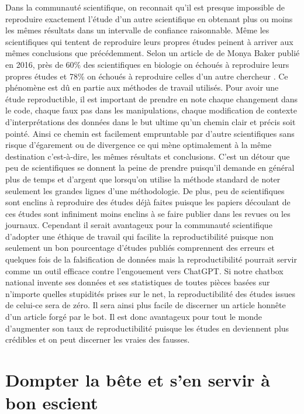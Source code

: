 \documentclass[preprint, 3p,
authoryear]{elsarticle} %
\begin{document}
Dans la communauté scientifique, on reconnait qu'il est presque
impossible de reproduire exactement l'étude d'un autre scientifique en
obtenant plus ou moins les mêmes résultats dans un intervalle de
confiance raisonnable. Même les scientifiques qui tentent de reproduire
leurs propres études peinent à arriver aux mêmes conclusions que
précédemment. Selon un article de de Monya Baker publié en 2016, près de
60\% des scientifiques en biologie on échoués à reproduire leurs propres
études et 78\% on échoués à reproduire celles d'un autre chercheur
\citep{open_science_collaboration_estimating_2015}. Ce phénomène est dû
en partie aux méthodes de travail utilisés. Pour avoir une étude
reproductible, il est important de prendre en note chaque changement
dans le code, chaque faux pas dans les manipulations, chaque
modification de contexte d'interprétations des données dans le but
ultime qu'un chemin clair et précis soit pointé. Ainsi ce chemin est
facilement empruntable par d'autre scientifiques sans risque d'égarement
ou de divergence ce qui mène optimalement à la même destination
c'est-à-dire, les mêmes résultats et conclusions. C'est un détour que
peu de scientifiques se donnent la peine de prendre puisqu'il demande en
général plus de temps et d'argent que lorsqu'on utilise la méthode
standard de noter seulement les grandes lignes d'une méthodologie. De
plus, peu de scientifiques sont enclins à reproduire des études déjà
faites puisque les papiers découlant de ces études sont infiniment moins
enclins à se faire publier dans les revues ou les journaux. Cependant il
serait avantageux pour la communauté scientifique d'adopter une éthique
de travail qui facilite la reproductibilité puisque non seulement un bon
pourcentage d'études publiés comprennent des erreurs et quelques fois de
la falsification de données mais la reproductibilité pourrait servir
comme un outil efficace contre l'engouement vers ChatGPT. Si notre
chatbox national invente ses données et ses statistiques de toutes
pièces basées sur n'importe quelles stupidités prises sur le net, la
reproductibilité des études issues de celui-ce sera de zéro. Il sera
ainsi plus facile de discerner un article honnête d'un article forgé par
le bot. Il est donc avantageux pour tout le monde d'augmenter son taux
de reproductibilité puisque les études en deviennent plus crédibles et
on peut discerner les vraies des fausses.

\hypertarget{dompter-la-buxeate-et-sen-servir-uxe0-bon-escient}{%
\section{\texorpdfstring{\textbf{Dompter la bête et s'en servir à bon
escient}}{Dompter la bête et s'en servir à bon escient}}\label{dompter-la-buxeate-et-sen-servir-uxe0-bon-escient}}
\end{document}
